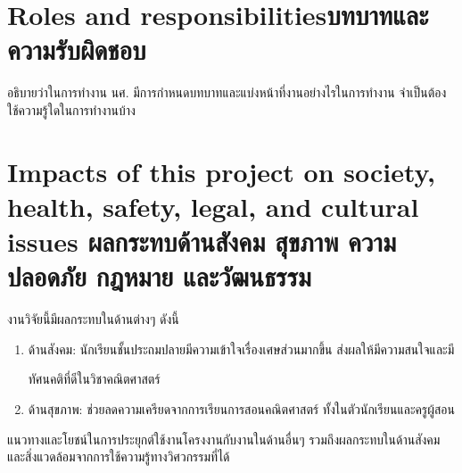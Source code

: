\section{\ifenglish Roles and responsibilities\else บทบาทและความรับผิดชอบ\fi}
อธิบายว่าในการทำงาน นศ. มีการกำหนดบทบาทและแบ่งหน้าที่งานอย่างไรในการทำงาน จำเป็นต้องใช้ความรู้ใดในการทำงานบ้าง

\section{\ifenglish%
Impacts of this project on society, health, safety, legal, and cultural issues
\else%
ผลกระทบด้านสังคม สุขภาพ ความปลอดภัย กฎหมาย และวัฒนธรรม
\fi}
งานวิจัยนี้มีผลกระทบในด้านต่างๆ ดังนี้
\begin{enumerate}
    \item ด้านสังคม: นักเรียนชั้นประถมปลายมีความเข้าใจเรื่องเศษส่วนมากขึ้น ส่งผลให้มีความสนใจและมี
    
    ทัศนคติที่ดีในวิชาคณิตศาสตร์
    \item ด้านสุขภาพ: ช่วยลดความเครียดจากการเรียนการสอนคณิตศาสตร์ ทั้งในตัวนักเรียนและครูผู้สอน
\end{enumerate}

แนวทางและโยชน์ในการประยุกต์ใช้งานโครงงานกับงานในด้านอื่นๆ รวมถึงผลกระทบในด้านสังคมและสิ่งแวดล้อมจากการใช้ความรู้ทางวิศวกรรมที่ได้
